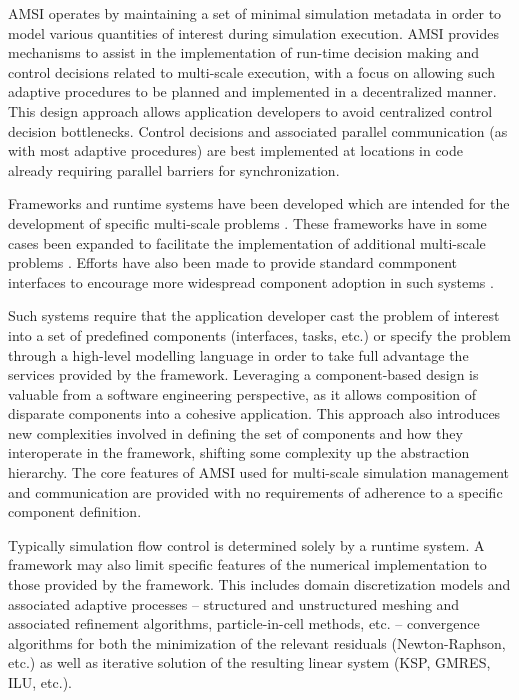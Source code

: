\documentclass[11pt]{article}
\begin{document}
AMSI operates by maintaining a set of minimal simulation metadata in order to model various quantities of interest during simulation execution.
AMSI provides mechanisms to assist in the implementation of run-time decision making and control decisions related to multi-scale execution, with a focus on allowing such adaptive procedures to be planned and implemented in a decentralized manner.
This design approach allows application developers to avoid centralized control decision bottlenecks.
Control decisions and associated parallel communication (as with most adaptive procedures) are best implemented at locations in code already requiring parallel barriers for synchronization.

Frameworks and runtime systems have been developed which are intended for the development of specific multi-scale problems \cite{davison2000uintah} \cite{parker2002component} \cite{chopard2011framework}.
These frameworks have in some cases been expanded to facilitate the implementation of additional multi-scale problems \cite{berzins2010uintah} \cite{parker20026component}.
Efforts have also been made to provide standard commponent interfaces to encourage more widespread component adoption in such systems \cite{armstrong1999toward}.

Such systems require that the application developer cast the problem of interest into a set of predefined components (interfaces, tasks, etc.) or specify the problem through a high-level modelling language in order to take full advantage the services provided by the framework.
Leveraging a component-based design is valuable from a software engineering perspective, as it allows composition of disparate components into a cohesive application.
This approach also introduces new complexities involved in defining the set of components and how they interoperate in the framework, shifting some complexity up the abstraction hierarchy.
The core features of AMSI used for multi-scale simulation management and communication are provided with no requirements of adherence to a specific component definition.

Typically simulation flow control is determined solely by a runtime system.
A framework may also limit specific features of the numerical implementation to those provided by the framework.
This includes domain discretization models and associated adaptive processes -- structured and unstructured meshing and associated refinement algorithms, particle-in-cell methods, etc. -- convergence algorithms for both the minimization of the relevant residuals (Newton-Raphson, etc.) as well as iterative solution of the resulting linear system (KSP, GMRES, ILU, etc.).
\end{document}
